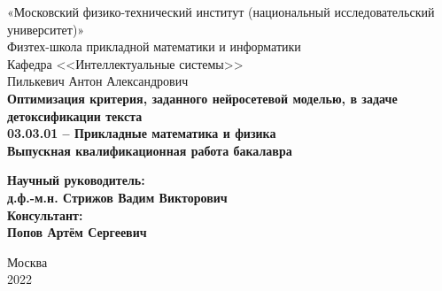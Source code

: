 \thispagestyle{empty}
\begin{center}
    \sc
        «Московский физико-технический институт \rm{(национальный исследовательский университет)}»\\
        Физтех-школа прикладной математики и информатики\\
        Кафедра <<Интеллектуальные системы>>
        \\[10mm]
    \rm\large
        Пилькевич Антон Александрович\\[10mm]
    \bf\Large
		Оптимизация критерия, заданного нейросетевой моделью, в задаче детоксификации текста\\[10mm]
    \rm\normalsize
        03.03.01 -- Прикладные математика и физика\\[10mm]
    \sc
        Выпускная квалификационная работа бакалавра\\[5mm]
\end{center}
\hfill\parbox{85mm}{
    \begin{flushleft}
    \bf
        Научный руководитель:\\
    \rm
        д.ф.-м.н. Стрижов Вадим Викторович\\
    \bf
        Консультант:\\
    \rm
        Попов Артём Сергеевич\\[7mm]
    \end{flushleft}
}
\begin{center}
    Москва\\
    2022
\end{center}